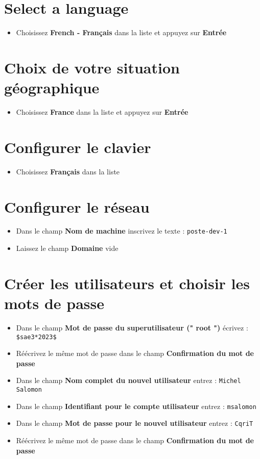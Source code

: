 \section{Select a language}
\begin{itemize}
	\item Choisissez \textbf{French - Français} dans la liste et appuyez sur \textbf{Entrée}
\end{itemize}

\section{Choix de votre situation géographique}
\begin{itemize}
	\item Choisissez \textbf{France} dans la liste et appuyez sur \textbf{Entrée}
\end{itemize}

\section{Configurer le clavier}
\begin{itemize}
	\item Choisissez \textbf{Français} dans la liste
\end{itemize}

\section{Configurer le réseau}

\begin{itemize}
	\item Dans le champ \textbf{Nom de machine} inscrivez le texte : \texttt{poste-dev-1}
	\item Laissez le champ \textbf{Domaine} vide
\end{itemize}

\section{Créer les utilisateurs et choisir les mots de passe}
\begin{itemize}
	\item Dans le champ \textbf{Mot de passe du superutilisateur (" root ")} écrivez : \texttt{\$sae3*2023\$}
	\item Réécrivez le même mot de passe dans le champ \textbf{Confirmation du mot de passe}
	\item Dans le champ \textbf{Nom complet du nouvel utilisateur} entrez : \texttt{Michel Salomon}
	\item Dans le champ \textbf{Identifiant pour le compte utilisateur} entrez : \texttt{msalomon}
	\item Dans le champ \textbf{Mot de passe pour le nouvel utilisateur} entrez : \texttt{CqriT}
	\item Réécrivez le même mot de passe dans le champ \textbf{Confirmation du mot de passe}
\end{itemize}

